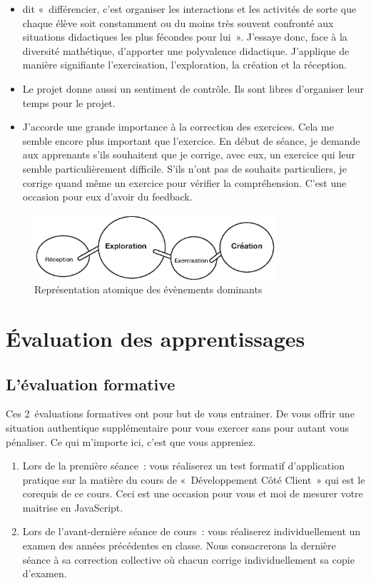 \begin{itemize}
    \item \citet{perrenoud1992differenciation} dit «~différencier, c’est organiser les interactions et les activités de sorte que chaque élève soit constamment ou du moins très souvent confronté aux situations didactiques les plus fécondes pour lui~». J’essaye donc, face à la diversité mathétique, d’apporter une polyvalence didactique. J'applique de manière signifiante l'exercisation, l'exploration, la création et la réception.
    \item Le projet donne aussi un sentiment de contrôle. Ils sont libres d'organiser leur temps pour le projet.
    \item J'accorde une grande importance à la correction des exercices. Cela me semble encore plus important que l'exercice. En début de séance, je demande aux apprenants s'ils souhaitent que je corrige, avec eux, un exercice qui leur semble particulièrement difficile. S’ils n’ont pas de souhaits particuliers, je corrige quand même un exercice pour vérifier la compréhension. C'est une occasion pour eux d’avoir du feedback.
\end{itemize}
\begin{figure}[H]
    \begin{center}
        \includegraphics[width=0.8\textwidth]{figures/EAEs.eps}
        \caption{Représentation atomique des évènements dominants \cite{leclercq2008modele}}
    \end{center}
\end{figure}
\clearpage

\section{Évaluation des apprentissages}

\subsection{L’évaluation formative}
\label{eval_formative}

Ces 2~évaluations formatives ont pour but de vous entrainer. De vous offrir une situation authentique supplémentaire pour vous exercer sans pour autant vous pénaliser. Ce qui m'importe ici, c'est que vous appreniez.
\begin{enumerate}
    \item Lors de la première séance~: vous réaliserez un test formatif d’application pratique sur la matière du cours de «~Développement Côté Client~» qui est le corequis de ce cours. Ceci est une occasion pour vous et moi de mesurer votre maitrise en JavaScript.
    \item Lors de l'avant-dernière séance de cours~: vous réaliserez individuellement un examen des années précédentes en classe. Nous consacrerons la dernière séance à sa correction collective où chacun corrige individuellement sa copie d'examen.
\end{enumerate}

